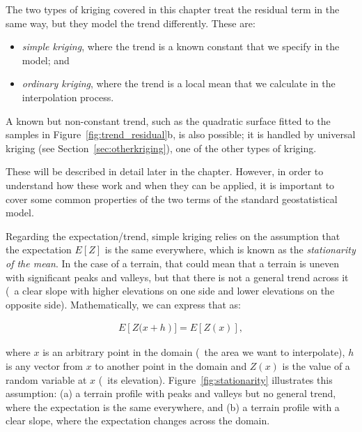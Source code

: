 The two types of kriging covered in this chapter treat the residual term in the same way, but they model the trend differently.
These are:
\begin{itemize}
\item \emph{simple kriging}, where the trend is a known constant that we specify in the model; and
\item \emph{ordinary kriging}, where the trend is a local mean that we calculate in the interpolation process.
\end{itemize}

A known but non-constant trend, such as the quadratic surface fitted to the samples in Figure~\ref{fig:trend_residual}b, is also possible; it is handled by universal kriging (see Section~\ref{sec:otherkriging}), one of the other types of kriging.

These will be described in detail later in the chapter.
However, in order to understand how these work and when they can be applied, it is important to cover some common properties of the two terms of the standard geostatistical model.

Regarding the expectation/trend, simple kriging relies on the assumption that the expectation \(E[Z]\) is the same everywhere, which is known as the \emph{stationarity of the mean}.
In the case of a terrain, that could mean that a terrain is uneven with significant peaks and valleys, but that there is not a general trend across it (\eg\ a clear slope with higher elevations on one side and lower elevations on the opposite side).
Mathematically, we can express that as:

\begin{align}
\label{eq:stationarityofthemean}
E\left[Z(x+h\right)] = E\left[Z(x)\right],
\end{align}

where \(x\) is an arbitrary point in the domain (\ie\ the area we want to interpolate), \(h\) is any vector from \(x\) to another point in the domain and \(Z(x)\) is the value of a random variable at \(x\) (\eg\ its elevation).
Figure~\ref{fig:stationarity} illustrates this assumption: (a) a terrain profile with peaks and valleys but no general trend, where the expectation is the same everywhere, and (b) a terrain profile with a clear slope, where the expectation changes across the domain.

